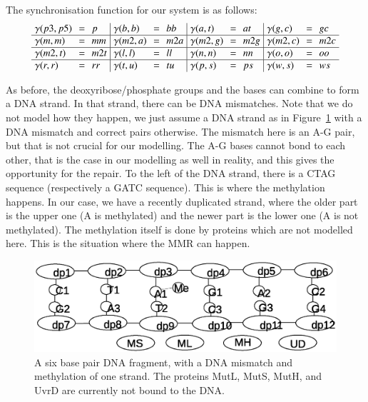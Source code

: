 \documentclass[review]{elsarticle}
\begin{document}
The synchronisation function for our system is as follows:
%
\[\arraycolsep=3.4pt\def\arraystretch{1.0}
\begin{array}{ l c l | l c l | l c l | l c l}
\gamma(p3,p5) & = & p & \gamma(b,b) & = & bb & \gamma(a,t) & = & at &  \gamma(g,c) & = & gc \\
\hline
\gamma(m,m) & = & mm & \gamma(m2,a) & = & m2a & \gamma(m2, g) & = & m2g & \gamma(m2,c) & = & m2c \\
\hline
\gamma(m2,t) & = & m2t & \gamma(l,l) & = & ll &\gamma(n,n) & = & nn & \gamma(o,o) & = & oo\\
\hline
\gamma(r,r) & = & rr & \gamma(t,u) & = & tu &\gamma(p,s) & = & ps &\gamma(w,s) & = & ws\\
\end{array}
\]

As before, the deoxyribose/phosphate groups and the bases can combine to form a DNA strand. In that strand, there can be DNA mismatches. Note that we do not model how they happen, we just assume a DNA strand as in Figure~\ref{fig:state1} with a DNA mismatch and correct pairs otherwise. The mismatch here is an A-G pair, but that is not crucial for our modelling. The A-G bases cannot bond to each other, that is the case in our modelling as well in reality, and this gives the opportunity for the repair. To the left of the DNA strand, there is a CTAG sequence (respectively a GATC sequence). This is where the methylation happens. In our case, we have a recently duplicated strand, where the older part is the upper one (A is methylated) and the newer part is the lower one (A is not methylated). The methylation itself is done by proteins which are not modelled here. This is the situation where the MMR can happen.

\begin{figure}[h!]
  \centering
    \includegraphics[width=1.0\textwidth]{mmr/state1}
  \caption[A six base pair DNA fragment.]{A six base pair DNA fragment, with a DNA mismatch and methylation of one strand. The proteins MutL, MutS, MutH, and UvrD are currently not bound to the DNA.}
  \label{fig:state1}
\end{figure}
\end{document}
